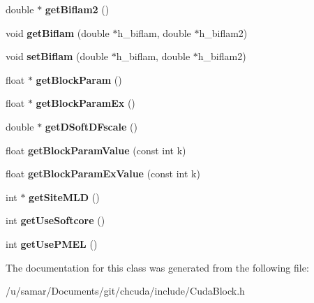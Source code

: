 \begin{DoxyCompactItemize}
\item 
\hypertarget{classCudaBlock_a4786b3496e94c61c368c835b18759780}{}\label{classCudaBlock_a4786b3496e94c61c368c835b18759780} 
double $\ast$ {\bfseries get\+Biflam2} ()
\item 
\hypertarget{classCudaBlock_a084db6c66816cd67e7f1f4d5fdf45ed4}{}\label{classCudaBlock_a084db6c66816cd67e7f1f4d5fdf45ed4} 
void {\bfseries get\+Biflam} (double $\ast$h\+\_\+biflam, double $\ast$h\+\_\+biflam2)
\item 
\hypertarget{classCudaBlock_a10590b0590b77f035344c640910cc751}{}\label{classCudaBlock_a10590b0590b77f035344c640910cc751} 
void {\bfseries set\+Biflam} (double $\ast$h\+\_\+biflam, double $\ast$h\+\_\+biflam2)
\item 
\hypertarget{classCudaBlock_a3eb37141bc8dec2a147dc8510e855bb6}{}\label{classCudaBlock_a3eb37141bc8dec2a147dc8510e855bb6} 
float $\ast$ {\bfseries get\+Block\+Param} ()
\item 
\hypertarget{classCudaBlock_aed739a43cb9a49d6b090bc6b921b2a21}{}\label{classCudaBlock_aed739a43cb9a49d6b090bc6b921b2a21} 
float $\ast$ {\bfseries get\+Block\+Param\+Ex} ()
\item 
\hypertarget{classCudaBlock_a65af2f17a316387636944c6a53e2d74b}{}\label{classCudaBlock_a65af2f17a316387636944c6a53e2d74b} 
double $\ast$ {\bfseries get\+D\+Soft\+D\+Fscale} ()
\item 
\hypertarget{classCudaBlock_aa9c209c93a7c2c156a5ddf5caa23e6b9}{}\label{classCudaBlock_aa9c209c93a7c2c156a5ddf5caa23e6b9} 
float {\bfseries get\+Block\+Param\+Value} (const int k)
\item 
\hypertarget{classCudaBlock_ab66a4a3b414fe8ae0434e5e341c8ac92}{}\label{classCudaBlock_ab66a4a3b414fe8ae0434e5e341c8ac92} 
float {\bfseries get\+Block\+Param\+Ex\+Value} (const int k)
\item 
\hypertarget{classCudaBlock_a6e2e448f21d6580748af20feb52abeb8}{}\label{classCudaBlock_a6e2e448f21d6580748af20feb52abeb8} 
int $\ast$ {\bfseries get\+Site\+M\+LD} ()
\item 
\hypertarget{classCudaBlock_a99b0b2c2e791bcc8f480965eb428024e}{}\label{classCudaBlock_a99b0b2c2e791bcc8f480965eb428024e} 
int {\bfseries get\+Use\+Softcore} ()
\item 
\hypertarget{classCudaBlock_ad801d7ab49d72e118f0876f993d9866e}{}\label{classCudaBlock_ad801d7ab49d72e118f0876f993d9866e} 
int {\bfseries get\+Use\+P\+M\+EL} ()
\end{DoxyCompactItemize}


The documentation for this class was generated from the following file\+:\begin{DoxyCompactItemize}
\item 
/u/samar/\+Documents/git/chcuda/include/Cuda\+Block.\+h\end{DoxyCompactItemize}
